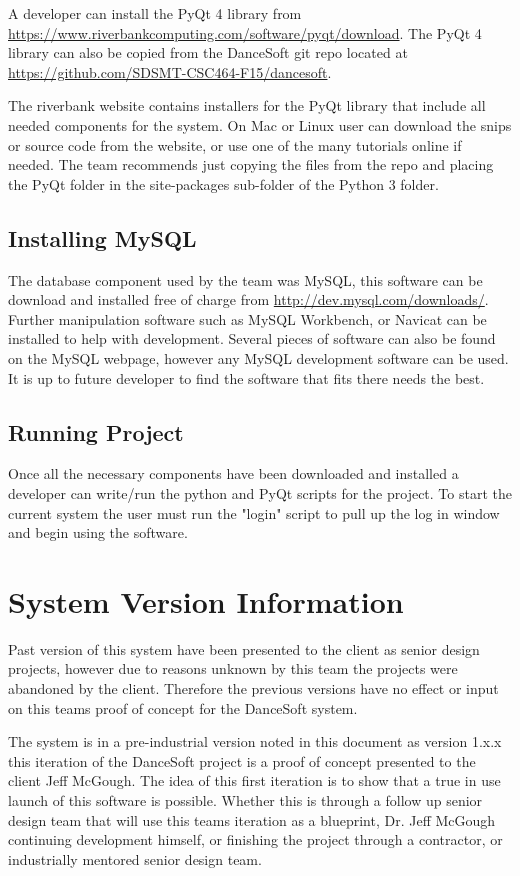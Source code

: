 A developer can install the PyQt 4 library from \url{https://www.riverbankcomputing.com/software/pyqt/download}. The PyQt 4 library can also be copied from the DanceSoft git repo located at \url{https://github.com/SDSMT-CSC464-F15/dancesoft}.

The riverbank website contains installers for the PyQt library that include all needed components for the system. On Mac or Linux user can download the snips or source code from the website, or use one of the many tutorials online if needed. The team recommends just copying the files from the repo and placing the PyQt folder in the site-packages sub-folder of the Python 3 folder. 

\subsection{Installing MySQL}
The database component used by the team was MySQL, this software can be download and installed free of charge from \url{http://dev.mysql.com/downloads/}. Further manipulation software such as MySQL Workbench, or Navicat can be installed to help with development. Several pieces of  software can also be found on the MySQL webpage, however any MySQL development software can be used. It is up to future developer to find the software that fits there needs the best.

\subsection{Running Project}
Once all the necessary components have been downloaded and installed a developer can write/run the python and PyQt scripts for the project. To start the current system the user must run the "login" script to pull up the log in window and begin using the software. 


\section{System Version Information}
Past version of this system have been presented to the client as senior design projects, however due to reasons unknown by this team the projects were abandoned by the client. Therefore the previous versions have no effect or input on this teams proof of concept for the DanceSoft system. 

The system is in a pre-industrial version noted in this document as version 1.x.x this iteration of the DanceSoft project is a proof of concept presented to the client Jeff McGough. The idea of this first iteration is to show that a true in use launch of this software is possible. Whether this is through a follow up senior design team that will use this teams iteration as a blueprint, Dr. Jeff McGough continuing development himself, or finishing the project through a contractor, or industrially mentored senior design team.

